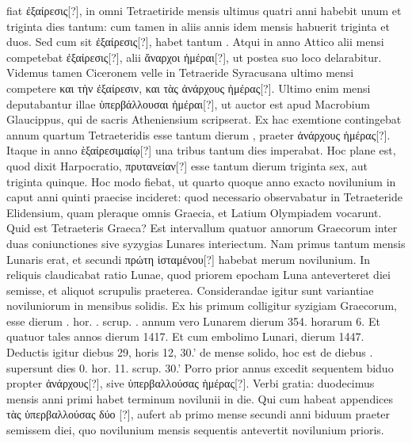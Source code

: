 fiat \textgreek{ἐξαίρεσις[?]}, in omni Tetraetiride mensis ultimus quatri anni
 habebit
unum et triginta dies tantum: cum tamen in aliis annis idem mensis habuerit
triginta et duos.
Sed cum sit \textgreek{ἐξαίρεσις[?]}, habet tantum .
Atqui
in anno Attico alii mensi competebat \textgreek{ἐξαίρεσις[?]}, alii
 \textgreek{ἄναρχοι ἡμέραι[?]}, ut postea
suo loco delarabitur.
Videmus tamen Ciceronem velle in Tetraeride
Syracusana ultimo mensi competere
 \textgreek{και τὴν ἐξαίρεσιν, και τὰς ἀνάρχους
ἡμέρας[?]}.
Ultimo enim mensi deputabantur illae
 \textgreek{ὑπερβάλλουσαι ἡμέραι[?]},
ut auctor est apud Macrobium Glaucippus, qui de sacris Atheniensium
scripserat.
Ex hac exemtione contingebat annum quartum Tetraeteridis
esse tantum dierum , praeter \textgreek{ἀνάρχους ἡμέρας[?]}.
Itaque in anno
\textgreek{ὲξαίρεσιμαίῳ[?]} una tribus  tantum dies imperabat.
Hoc plane est,
quod dixit Harpocratio, \textgreek{πρυτανείαν[?]} esse tantum
 dierum triginta sex, aut
triginta quinque.
%
Hoc modo fiebat, ut quarto quoque anno exacto novilunium
in caput anni quinti praecise incideret: quod necessario observabatur
in Tetraeteride Elidensium, quam pleraque omnis Graecia,
et Latium Olympiadem vocarunt.
Quid est Tetraeteris Graeca?
Est
intervallum quatuor annorum Graecorum inter duas coniunctiones sive
syzygias Lunares interiectum.
Nam primus tantum mensis Lunaris
erat, et secundi \textgreek{πρώτη ἱσταμένου[?]} habebat merum novilunium.
In reliquis
claudicabat ratio Lunae, quod priorem epocham Luna anteverteret
diei semisse, et aliquot scrupulis praeterea.
Considerandae igitur sunt
variantiae noviluniorum in mensibus solidis.
Ex his primum colligitur
syzigiam Graecorum, esse dierum .
 hor. . scrup. . annum
vero Lunarem dierum 354. horarum 6.
Et quatuor tales annos dierum
1417.
Et cum embolimo Lunari, dierum 1447.
Deductis igitur
diebus 29, horis 12, 30.' de mense solido, hoc est de diebus .
supersunt dies 0. hor. 11. scrup. 30.'
Porro prior annus excedit sequentem
biduo propter \textgreek{ἀνάρχους[?]},
 sive \textgreek{ὑπερβαλλούσας ἡμέρας[?]}.
Verbi gratia:
duodecimus mensis anni primi habet terminum novilunii in 
die.
Qui cum habeat appendices \textgreek{τὰς ὑπερβαλλούσας δύο [?]},
 aufert ab primo
mense secundi anni biduum praeter semissem diei, quo novilunium
mensis sequentis antevertit novilunium prioris.

